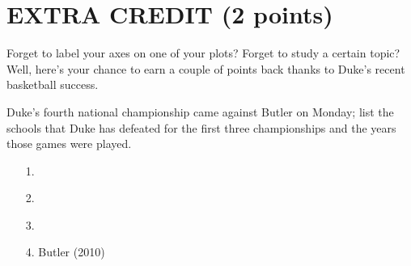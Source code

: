 \documentclass[12pt]{article}
\begin{document}


\section{EXTRA CREDIT (2 points)}

Forget to label your axes on one of your plots?  Forget to study a certain
topic?  Well, here's your chance to earn a couple of points back thanks to
Duke's recent basketball success.

Duke's fourth national championship came against Butler on Monday; list the schools that Duke has defeated for the first three championships and the years those games were played.

\begin{enumerate}
\item[1.]
\item[2.]
\item[3.]
\item[4.] Butler (2010)
\end{enumerate}
\end{document}

